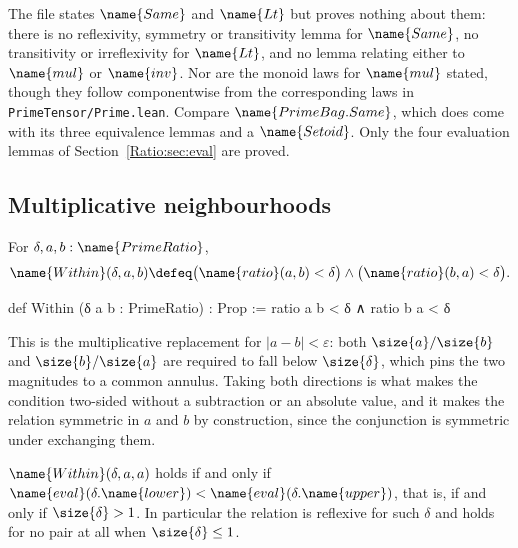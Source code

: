 \begin{remark}\label{Ratio:rem:no-laws}
The file states $\name{Same}$ and $\name{Lt}$ but proves nothing about them:
there is no reflexivity, symmetry or transitivity lemma for $\name{Same}$, no
transitivity or irreflexivity for $\name{Lt}$, and no lemma relating either to
$\name{mul}$ or $\name{inv}$.  Nor are the monoid laws for $\name{mul}$
stated, though they follow componentwise from the corresponding laws in
\texttt{PrimeTensor/Prime.lean}.  Compare $\name{PrimeBag.Same}$, which does
come with its three equivalence lemmas and a $\name{Setoid}$.  Only the four
evaluation lemmas of Section~\ref{Ratio:sec:eval} are proved.
\end{remark}

\subsection{Multiplicative neighbourhoods}

\begin{definition}
\label{Ratio:def:within}
For $\delta, a, b : \name{PrimeRatio}$,
\[
  \name{Within}(\delta, a, b) \defeq
    \bigl(\name{ratio}(a,b) < \delta\bigr) \wedge
    \bigl(\name{ratio}(b,a) < \delta\bigr).
\]
\end{definition}

\begin{leancode}
def Within (δ a b : PrimeRatio) : Prop :=
  ratio a b < δ ∧ ratio b a < δ
\end{leancode}

This is the multiplicative replacement for $\lvert a - b \rvert < \varepsilon$:
both $\size{a}/\size{b}$ and $\size{b}/\size{a}$ are required to fall below
$\size{\delta}$, which pins the two magnitudes to a common annulus.  Taking
both directions is what makes the condition two-sided without a subtraction
or an absolute value, and it makes the relation symmetric in $a$ and $b$ by
construction, since the conjunction is symmetric under exchanging them.

\begin{proposition}\label{Ratio:prop:refl}
$\name{Within}(\delta, a, a)$ holds if and only if
$\name{eval}(\delta.\name{lower}) < \name{eval}(\delta.\name{upper})$, that
is, if and only if $\size{\delta} > 1$.  In particular the relation is
reflexive for such $\delta$ and holds for no pair at all when
$\size{\delta} \leq 1$.
\end{proposition}

